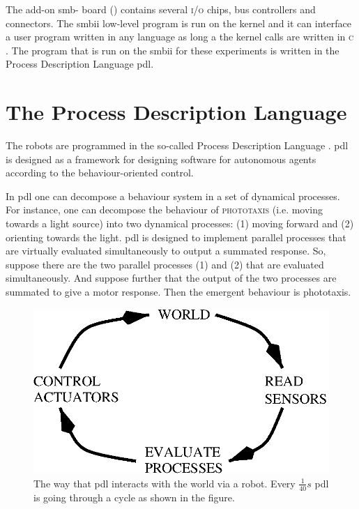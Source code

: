 The add-on {\sc smb}-{} board () contains several {\scshape i/o} chips, bus controllers and connectors. The {\sc smbii} low-level program is run on the kernel and it can interface a user program written in any language as long a the kernel calls are written in \textsc{c}  \citep{vereertbrugghen:1996}. The program that is run on the {\sc smbii} for these experiments is written in the Process Description Language {\sc pdl}. 

\section{The Process Description Language}\label{s:robots:PDL}\label{s:robots:pdl}

The robots are programmed in the so-called Process Description Language \citep{steels:1992,steels:1994a,steels:1994b}. {\sc pdl} is designed as a framework for designing software for autonomous agents according to the behaviour-oriented control. 

In {\sc pdl} one can decompose a behaviour system in a set of dynamical processes. For instance, one can decompose the behaviour of {\scshape phototaxis} (i.e. moving towards a light source) into two dynamical processes: (1) moving forward and (2) orienting towards the light. {\sc pdl} is designed to implement parallel processes that are virtually evaluated simultaneously to output a summated response. So, suppose there are the two parallel processes (1) and (2) that are evaluated  simultaneously. And suppose further that the output of the two processes are summated to give a motor response. Then the emergent behaviour is phototaxis. 

\begin{figure}
\centerline{\includegraphics[width=.5\textwidth]{robots//pdlcycle.eps}}
\caption{The way that {\sc pdl} interacts with the world via a robot. Every $\frac{1}{40} s$ {\sc pdl} is going through a cycle as shown in the figure.}
\label{f:pdlcycle}
\end{figure}

